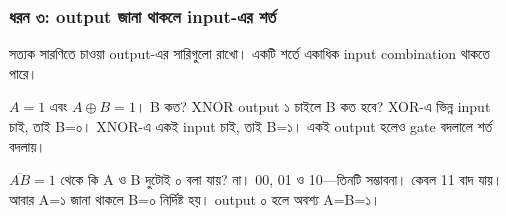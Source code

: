 \subsubsection*{ধরন ৩: output জানা থাকলে input-এর শর্ত}
সত্যক সারণিতে চাওয়া output-এর সারিগুলো রাখো। একটি শর্তে একাধিক input combination থাকতে পারে।
\par\smallskip\noindent\begin{minipage}{\linewidth}
$A=1$ এবং $A\oplus B=1$। B কত? XNOR output ১ চাইলে B কত হবে?
\chThreeAnswer XOR-এ ভিন্ন input চাই, তাই B=০। XNOR-এ একই input চাই, তাই B=১। একই output হলেও gate বদলালে শর্ত বদলায়।

\end{minipage}\par\smallskip
\par\smallskip\noindent\begin{minipage}{\linewidth}
$\overline{AB}=1$ থেকে কি A ও B দুটোই ০ বলা যায়?
\chThreeAnswer না। 00, 01 ও 10—তিনটি সম্ভাবনা। কেবল 11 বাদ যায়। আবার A=১ জানা থাকলে B=০ নির্দিষ্ট হয়। output ০ হলে অবশ্য A=B=১।

\end{minipage}\par\smallskip
{}
